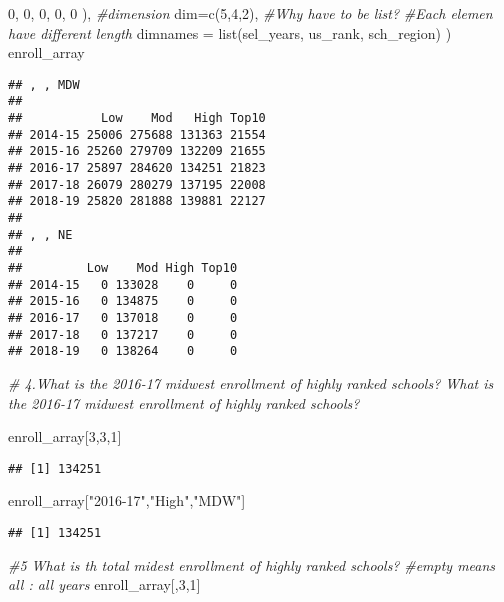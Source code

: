 \documentclass[
]{article}
\newenvironment{Shaded}{\begin{snugshade}}{\end{snugshade}}
\newcommand{\AttributeTok}[1]{\textcolor[rgb]{0.77,0.63,0.00}{#1}}
\newcommand{\CommentTok}[1]{\textcolor[rgb]{0.56,0.35,0.01}{\textit{#1}}}
\newcommand{\DecValTok}[1]{\textcolor[rgb]{0.00,0.00,0.81}{#1}}
\newcommand{\FunctionTok}[1]{\textcolor[rgb]{0.00,0.00,0.00}{#1}}
\newcommand{\NormalTok}[1]{#1}
\newcommand{\StringTok}[1]{\textcolor[rgb]{0.31,0.60,0.02}{#1}}
\begin{document}
\begin{Shaded}
\begin{Highlighting}[]
    \DecValTok{0}\NormalTok{, }\DecValTok{0}\NormalTok{,   }\DecValTok{0}\NormalTok{, }\DecValTok{0}\NormalTok{,   }\DecValTok{0}
\NormalTok{  ),}
  \CommentTok{\#dimension }
  \AttributeTok{dim=}\FunctionTok{c}\NormalTok{(}\DecValTok{5}\NormalTok{,}\DecValTok{4}\NormalTok{,}\DecValTok{2}\NormalTok{),}
  \CommentTok{\#Why have to be list? }
  \CommentTok{\#Each elemen have different length }
  \AttributeTok{dimnames =} \FunctionTok{list}\NormalTok{(sel\_years, us\_rank, sch\_region)}
\NormalTok{)}
\NormalTok{enroll\_array}
\end{Highlighting}
\end{Shaded}

\begin{verbatim}
## , , MDW
## 
##           Low    Mod   High Top10
## 2014-15 25006 275688 131363 21554
## 2015-16 25260 279709 132209 21655
## 2016-17 25897 284620 134251 21823
## 2017-18 26079 280279 137195 22008
## 2018-19 25820 281888 139881 22127
## 
## , , NE
## 
##         Low    Mod High Top10
## 2014-15   0 133028    0     0
## 2015-16   0 134875    0     0
## 2016-17   0 137018    0     0
## 2017-18   0 137217    0     0
## 2018-19   0 138264    0     0
\end{verbatim}

\begin{Shaded}
\begin{Highlighting}[]
\CommentTok{\# 4.What is the 2016{-}17 midwest enrollment of highly ranked schools? What is the 2016{-}17 midwest enrollment of highly ranked schools?}


\NormalTok{enroll\_array[}\DecValTok{3}\NormalTok{,}\DecValTok{3}\NormalTok{,}\DecValTok{1}\NormalTok{]}
\end{Highlighting}
\end{Shaded}

\begin{verbatim}
## [1] 134251
\end{verbatim}

\begin{Shaded}
\begin{Highlighting}[]
\NormalTok{enroll\_array[}\StringTok{"2016{-}17"}\NormalTok{,}\StringTok{"High"}\NormalTok{,}\StringTok{"MDW"}\NormalTok{]}
\end{Highlighting}
\end{Shaded}

\begin{verbatim}
## [1] 134251
\end{verbatim}

\begin{Shaded}
\begin{Highlighting}[]
\CommentTok{\#5 What is th total midest enrollment of highly ranked schools?}
\CommentTok{\#empty means all : all years }
\NormalTok{enroll\_array[,}\DecValTok{3}\NormalTok{,}\DecValTok{1}\NormalTok{]}
\end{Highlighting}
\end{Shaded}
\end{document}
